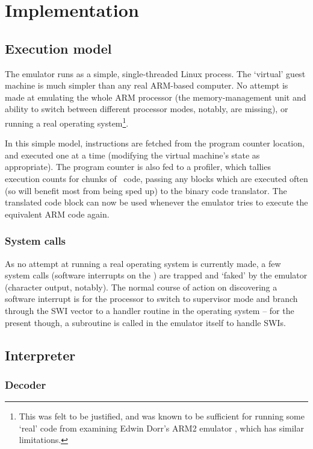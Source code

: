 \chapter{Implementation}

\section{Execution model}

The emulator runs as a simple, single-threaded Linux process. The `virtual' guest machine is much simpler than any real ARM-based computer. No attempt is made at emulating the whole ARM processor (the memory-management unit and ability to switch between different processor modes, notably, are missing), or running a real operating system\footnote{This was felt to be justified, and was known to be sufficient for running some `real' code from examining Edwin Dorr's ARM2 emulator \cite{Dorr9X}, which has similar limitations.}.

In this simple model, instructions are fetched from the program counter location, and executed one at a time (modifying the virtual machine's state as appropriate). The program counter is also fed to a profiler, which tallies execution counts for chunks of \arm\ code, passing any blocks which are executed often (so will benefit most from being sped up) to the binary code translator. The translated code block can now be used whenever the emulator tries to execute the equivalent ARM code again.

\subsection{System calls}

As no attempt at running a real operating system is currently made, a few system calls (software interrupts on the \arm) are trapped and `faked' by the emulator (character output, notably). The normal course of action on discovering a software interrupt is for the processor to switch to supervisor mode and branch through the SWI vector to a handler routine in the operating system -- for the present though, a subroutine is called in the emulator itself to handle SWIs.

\section{Interpreter}

\subsection{Decoder}

